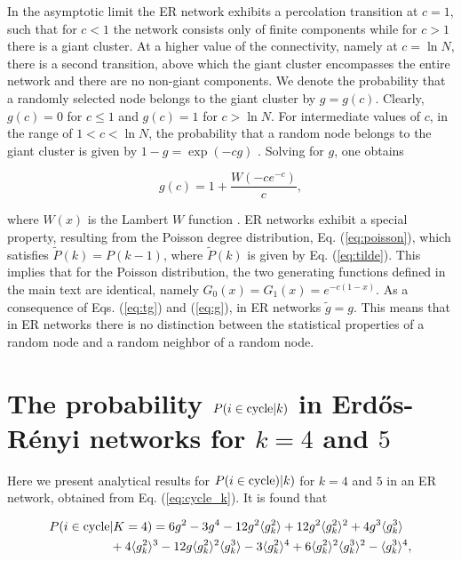 \documentclass[preprint,pre,superscriptaddress,showpacs]{revtex4}
\begin{document}
In the asymptotic limit 
the ER
network exhibits a percolation transition at $c=1$, such that for
$c<1$
the network consists only of finite components 
while for 
$c>1$
there is a giant cluster. 
At a higher value of the connectivity, namely at 
$c = \ln N$, 
there is a second transition, above which
the giant cluster encompasses 
the entire network and there are 
no non-giant components. 
We denote the probability that a randomly selected node belongs to the
giant cluster by $g=g(c)$.
Clearly, $g(c) = 0$ for $c \le 1$ and $g(c)=1$ for $c > \ln N$.
For intermediate values of $c$, in the range of
$1 < c < \ln N$, 
the probability that a random node belongs
to the giant cluster
is given by 
$1-g =  \exp(-cg)$
\cite{Bollobas2001}.
Solving for $g$, one obtains

\begin{equation}
g(c)= 1 + \frac{W(-c e^{-c})}{c},
\label{eq:g(c)}
\end{equation}

\noindent
where $W(x)$ is the Lambert $W$ function
\cite{Olver2010}.
ER networks exhibit a special property, 
resulting from the Poisson degree distribution,
Eq. (\ref{eq:poisson}), 
which satisfies
$\tilde P(k) = P(k-1)$,
where 
${\widetilde P}(k)$ 
is given by 
Eq. (\ref{eq:tilde}).
This implies that for the Poisson distribution, the two generating functions defined 
in the main text
are identical, namely 
$G_0(x)=G_1(x)=e^{-c(1-x)}$.
As a consequence of 
Eqs. (\ref{eq:tg}) and (\ref{eq:g}), in ER networks
${\tilde g} = g$. 
This means that in ER networks there is no distinction between 
the statistical properties of a random node and a random neighbor
of a random node.


\section{The probability $P(i \in {\rm cycle} | k)$ in Erd{\H o}s-R\'enyi 
networks for $k=4$ and $5$}

Here we present analytical results for 
$P(i \in {\rm cycle}) | k)$
for $k=4$ and $5$ in an ER network, obtained
from Eq. (\ref{eq:cycle_k}).
It is found that

\begin{eqnarray}
P(i \in {\rm cycle}&| K=4)
=
6g^2 - 3g^4 
-12 g^2 \langle g_k^2 \rangle
+12 g^2 \langle g_k^2 \rangle^2
+4 g^3 \langle g_k^3 \rangle
\nonumber \\
&
+4 \langle g_k^2 \rangle^3
-12 g \langle g_k^2 \rangle^2 \langle g_k^3 \rangle
-3 \langle g_k^2 \rangle^4
+6  \langle g_k^2 \rangle^2 \langle g_k^3 \rangle^2
- \langle g_k^3 \rangle^4,
\label{eq:icyc4}
\end{eqnarray}
\end{document}

